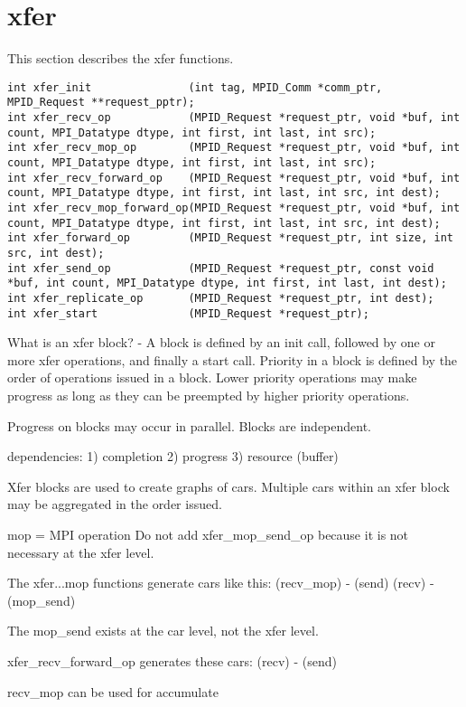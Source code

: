 \documentclass[dvipdfm,twoside,11pt]{article}
\begin{document}
\section{xfer}
This section describes the xfer functions.
\begin{verbatim}
int xfer_init               (int tag, MPID_Comm *comm_ptr, MPID_Request **request_pptr);
int xfer_recv_op            (MPID_Request *request_ptr, void *buf, int count, MPI_Datatype dtype, int first, int last, int src);
int xfer_recv_mop_op        (MPID_Request *request_ptr, void *buf, int count, MPI_Datatype dtype, int first, int last, int src);
int xfer_recv_forward_op    (MPID_Request *request_ptr, void *buf, int count, MPI_Datatype dtype, int first, int last, int src, int dest);
int xfer_recv_mop_forward_op(MPID_Request *request_ptr, void *buf, int count, MPI_Datatype dtype, int first, int last, int src, int dest);
int xfer_forward_op         (MPID_Request *request_ptr, int size, int src, int dest);
int xfer_send_op            (MPID_Request *request_ptr, const void *buf, int count, MPI_Datatype dtype, int first, int last, int dest);
int xfer_replicate_op       (MPID_Request *request_ptr, int dest);
int xfer_start              (MPID_Request *request_ptr);
\end{verbatim}

What is an xfer block? - A block is defined by an init call, followed by one 
or more xfer operations, and finally a start call.
Priority in a block is defined by the order of operations issued in a block.
Lower priority operations may make progress as long as they can be preempted
by higher priority operations.

Progress on blocks may occur in parallel.  Blocks are independent.

dependencies:
1) completion
2) progress
3) resource (buffer)

Xfer blocks are used to create graphs of cars. Multiple cars within an xfer 
block may be aggregated in the order issued.

mop = MPI operation
Do not add xfer\_mop\_send\_op because it is not necessary at the xfer level.

The xfer...mop functions generate cars like this:
(recv\_mop) - (send)
(recv) - (mop\_send)

The mop\_send exists at the car level, not the xfer level.

xfer\_recv\_forward\_op generates these cars:
(recv) - (send)

recv\_mop can be used for accumulate
\end{document}
